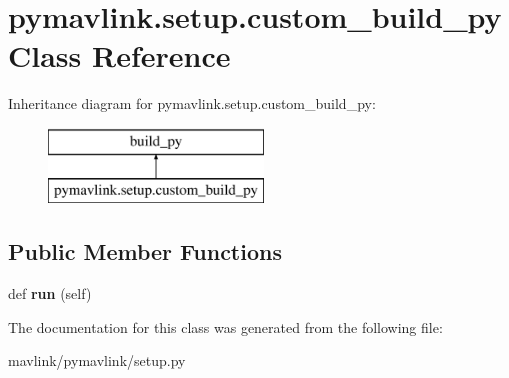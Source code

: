 \hypertarget{classpymavlink_1_1setup_1_1custom__build__py}{}\section{pymavlink.\+setup.\+custom\+\_\+build\+\_\+py Class Reference}
\label{classpymavlink_1_1setup_1_1custom__build__py}
Inheritance diagram for pymavlink.\+setup.\+custom\+\_\+build\+\_\+py\+:\begin{figure}[H]
\begin{center}
\leavevmode
\includegraphics[height=2.000000cm]{classpymavlink_1_1setup_1_1custom__build__py}
\end{center}
\end{figure}
\subsection*{Public Member Functions}
\begin{DoxyCompactItemize}
\item 
\mbox{\label{classpymavlink_1_1setup_1_1custom__build__py_acdc73ef2274a81288bb002d614fab3b6}} 
def {\bfseries run} (self)
\end{DoxyCompactItemize}


The documentation for this class was generated from the following file\+:\begin{DoxyCompactItemize}
\item 
mavlink/pymavlink/setup.\+py\end{DoxyCompactItemize}
